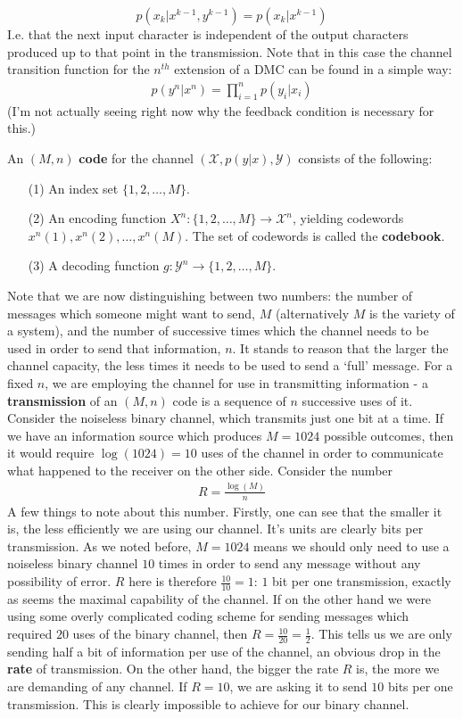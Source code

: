 \[ p(x_k|x^{k-1},y^{k-1}) = p(x_k|x^{k-1}) \]
I.e. that the next input character is independent of the output characters produced up to that point in the transmission. Note that in this case the channel transition function for the $n^{th}$ extension of a DMC can be found in a simple way:
\begin{align}
	p(y^n|x^n) = \prod_{i=1}^n p(y_i|x_i)
\end{align}
(I'm not actually seeing right now why the feedback condition is necessary for this.) \\
\begin{definition}
	An $(M,n)$ \textbf{code} for the channel $(\mathcal{X},p(y|x),\mathcal{Y})$ consists of the following:
	\begin{itemize}
		\item[(1)] An index set $\{1,2,\ldots,M\}$.
		\item[(2)] An encoding function $X^n:\{1,2,\ldots,M\} \to \mathcal{X}^n$, yielding codewords $x^n(1),x^n(2),\ldots,x^n(M)$. The set of codewords is called the \textbf{codebook}. 
		\item[(3)] A decoding function $g:\mathcal{Y}^n \to \{1,2,\ldots,M\}$. 
	\end{itemize}
\end{definition}
Note that we are now distinguishing between two numbers: the number of messages which someone might want to send, $M$ (alternatively $M$ is the variety of a system), and the number of successive times which the channel needs to be used in order to send that information, $n$. It stands to reason that the larger the channel capacity, the less times it needs to be used to send a `full' message. For a fixed $n$, we are employing the channel for use in transmitting information - a \textbf{transmission} of an $(M,n)$ code is a sequence of $n$ successive uses of it. Consider the noiseless binary channel, which transmits just one bit at a time. If we have an information source which produces $M=1024$ possible outcomes, then it would require $\log(1024) = 10$ uses of the channel in order to communicate what happened to the receiver on the other side. Consider the number 
\begin{align}
	R = \frac{\log(M)}{n}
\end{align} 
A few things to note about this number. Firstly, one can see that the smaller it is, the less efficiently we are using our channel. It's units are clearly bits per transmission. As we noted before, $M=1024$ means we should only need to use a noiseless binary channel $10$ times in order to send any message without any possibility of error. $R$ here is therefore $\frac{10}{10}=1$: $1$ bit per one transmission, exactly as seems the maximal capability of the channel. If on the other hand we were using some overly complicated coding scheme for sending messages which required $20$ uses of the binary channel, then $R = \frac{10}{20} = \frac{1}{2}$. This tells us we are only sending half a bit of information per use of the channel, an obvious drop in the \textbf{rate} of transmission. On the other hand, the bigger the rate $R$ is, the more we are demanding of any channel. If $R = 10$, we are asking it to send $10$ bits per one transmission. This is clearly impossible to achieve for our binary channel. \par 
